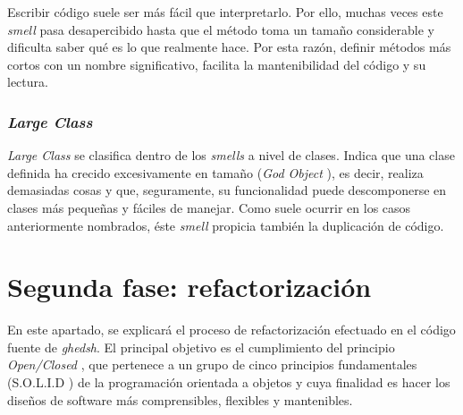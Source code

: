   Escribir código suele ser más fácil que interpretarlo. Por ello, muchas veces este {\it smell} pasa desapercibido hasta que el método toma un tamaño considerable y dificulta saber qué es lo que realmente hace. Por esta razón,
  definir métodos más cortos con un nombre significativo, facilita la mantenibilidad del código y su lectura.
  \bigskip
  \subsubsection{{\it \textbf{Large Class}}}
  {\it Large Class} se clasifica dentro de los {\it smells} a nivel de clases. Indica que una clase definida ha crecido excesivamente en tamaño ({\it God Object} \cite{B12}), es decir, realiza demasiadas cosas y que, seguramente, su funcionalidad puede descomponerse
  en clases más pequeñas y fáciles de manejar. Como suele ocurrir en los casos anteriormente nombrados, éste {\it smell} propicia también la duplicación de código.

\section{Segunda fase: refactorización}
\label{2:sec:2}

En este apartado, se explicará el proceso de refactorización efectuado en el código fuente de {\it ghedsh}. El principal objetivo es el cumplimiento del principio {\it Open/Closed} \cite{B13}, que pertenece a un grupo de cinco principios fundamentales (S.O.L.I.D \cite{CBle:2010}) de la programación orientada a objetos y cuya finalidad es
hacer los diseños de software más comprensibles, flexibles y mantenibles.
